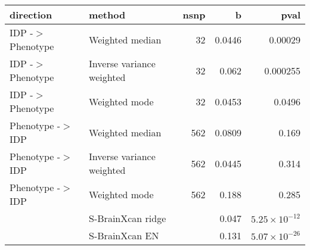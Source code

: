 \begin{table}[ht]
\centering
\begingroup\scriptsize
\begin{tabular}{llrrr}
  \toprule
{\textbf{direction}} & {\textbf{method}} & {\textbf{nsnp}} & {\textbf{b}} & {\textbf{pval}} \\ 
  \midrule
IDP -$>$ Phenotype & Weighted median &   32 & 0.0446 & 0.00029 \\ 
  IDP -$>$ Phenotype & Inverse variance weighted &   32 & 0.062 & 0.000255 \\ 
  IDP -$>$ Phenotype & Weighted mode &   32 & 0.0453 & 0.0496 \\ 
  Phenotype -$>$ IDP & Weighted median &  562 & 0.0809 & 0.169 \\ 
  Phenotype -$>$ IDP & Inverse variance weighted &  562 & 0.0445 & 0.314 \\ 
  Phenotype -$>$ IDP & Weighted mode &  562 & 0.188 & 0.285 \\ 
   & S-BrainXcan ridge &  & 0.047 & $5.25 \times 10^{-12}$ \\ 
   & S-BrainXcan EN &  & 0.131 & $5.07 \times 10^{-26}$ \\ 
   \bottomrule
\end{tabular}
\endgroup
\end{table}
